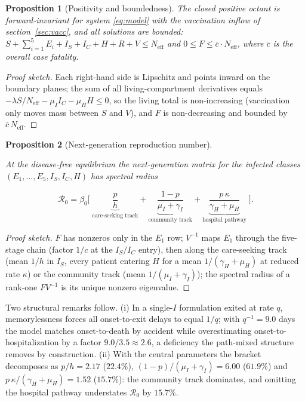 \documentclass[10pt]{plos}
\newtheorem{proposition}{Proposition}
\newcommand{\Reff}{\mathcal{R}}
\begin{document}
\begin{proposition}[Positivity and boundedness]\label{prop:pos}
The closed positive octant is forward-invariant for system
\eqref{eq:model} with the vaccination inflow of section~\ref{sec:vacc},
and all solutions are bounded:
$S+\sum_{i=1}^{5}E_i+I_S+I_C+H+R+V\le N_{\mathrm{eff}}$ and $0\le F\le
\bar c\cdot N_{\mathrm{eff}}$, where $\bar c$ is the overall case
fatality.
\end{proposition}
\begin{proof}[Proof sketch]
\begin{sloppypar}
Each right-hand side is Lipschitz and points inward on the boundary
planes; the sum of all living-compartment derivatives equals
$-\lambda S/N_{\mathrm{eff}}-\mu_I I_C-\mu_H H\le0$, so the living total
is non-increasing (vaccination only moves mass between $S$ and $V$), and
$F$ is non-decreasing and bounded by $\bar c\,N_{\mathrm{eff}}$.
\end{sloppypar}
\end{proof}

\begin{proposition}[Next-generation reproduction number]\label{prop:ngm}
\begin{sloppypar}
At the disease-free equilibrium the next-generation matrix for the
infected classes $(E_1,\dots,E_5,I_S,I_C,H)$ has spectral radius
\end{sloppypar}
\begin{equation}\label{eq:R0}
\Reff_0=\beta_0\Bigg[\;\underbrace{\frac{p}{h}}_{\text{care-seeking track}}
+\underbrace{\frac{1-p}{\mu_I+\gamma_I}}_{\text{community track}}
+\underbrace{\frac{p\,\kappa}{\gamma_H+\mu_H}}_{\text{hospital pathway}}\;\Bigg].
\end{equation}
\end{proposition}
\begin{proof}[Proof sketch]
$F$ has nonzeros only in the $E_1$ row; $V^{-1}$ maps $E_1$ through the
five-stage chain (factor $1/c$ at the $I_S/I_C$ entry), then along the
care-seeking track (mean $1/h$ in $I_S$, every patient entering $H$ for a
mean $1/(\gamma_H+\mu_H)$ at reduced rate $\kappa$) or the community
track (mean $1/(\mu_I+\gamma_I)$); the spectral radius of a rank-one
$FV^{-1}$ is its unique nonzero eigenvalue.
\end{proof}

Two structural remarks follow. (i) In a single-$I$ formulation exited at
rate $q$, memorylessness forces all onset-to-exit delays to equal $1/q$;
with $q^{-1}=9.0$ days the model matches onset-to-death by accident while
overestimating onset-to-hospitalization by a factor $9.0/3.5\approx2.6$,
a deficiency the path-mixed structure removes by construction. (ii) With
the central parameters the bracket decomposes as $p/h=2.17$ ($22.4\%$),
$(1-p)/(\mu_I+\gamma_I)=6.00$ ($61.9\%$) and
$p\,\kappa/(\gamma_H+\mu_H)=1.52$ ($15.7\%$): the community track
dominates, and omitting the hospital pathway understates $\Reff_0$ by
$15.7\%$.
\end{document}
